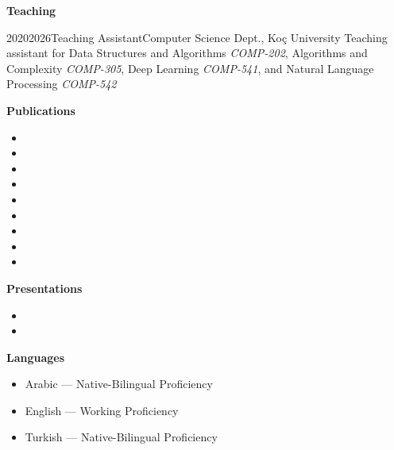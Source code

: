 \documentclass{cv}
\begin{document}
\textbf{Teaching}\\
	\begin{employment}{2020}{2026}{Teaching Assistant}{Computer Science Dept., Koç University}
	    Teaching assistant for Data Structures and Algorithms \textit{COMP-202}, Algorithms and Complexity \textit{COMP-305}, Deep Learning \textit{COMP-541}, and Natural Language Processing \textit{COMP-542} 
	\end{employment}
	\vspace{0.1in}

\begin{adjustwidth}{}{\rightedge}
\textbf{Publications}
\begin{itemize}
    \item {}
    \item {}
    \item {}
    \item {}
    \item {}
    \item {}
    \item {}
    \item {}
    \item {}
\end{itemize}
\vspace{0.1in}

\textbf{Presentations}
\begin{itemize}
    \item {}
    \item {}
\end{itemize}
\vspace{0.05in}

\textbf{Languages}
\begin{itemize}
    \item Arabic --- Native-Bilingual Proficiency
    \item English --- Working Proficiency
    \item Turkish --- Native-Bilingual Proficiency
\end{itemize}
\vspace{0.05in}


\end{adjustwidth}
\end{document}
